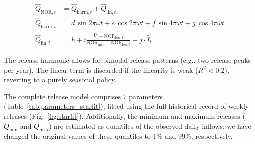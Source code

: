 \documentclass[hess, manuscript]{copernicus}
\begin{document}
{\small
\begin{equation}
\label{eq:starfit_release_linear}
    \begin{aligned}
        \hat{Q}_{\text{NOR},t} &= \hat{Q}_{\text{harm},t} + \hat{Q}_{\text{lin},t} \\[1ex]
        \hat{Q}_{\text{harm},t} &= d \, \sin 2\pi\omega t + e \, \cos 2\pi\omega t + f \, \sin 4\pi\omega t + g \, \cos 4\pi\omega t \\[1ex]
        \hat{Q}_{\text{lin},t} &= h + i \frac{\hat{V}_{t} - \text{NOR}_{\text{low},t}}{\text{NOR}_{\text{up},t} - \text{NOR}_{\text{low},t}} + j \cdot \hat{I}_{t}
    \end{aligned}
\end{equation}
}

The release harmonic allows for bimodal release patterns (e.g., two release peaks per year). The linear term is discarded if the linearity is weak ($R^2 < 0.2$), reverting to a purely seasonal policy.

The complete release model comprises 7 parameters (Table~\ref{tab:parameters_starfit}), fitted using the full historical record of weekly releases (Fig.~\ref{fig:starfit}). Additionally, the minimum and maximum releases ($Q_{\min}$ and $Q_{\max}$) are estimated as quantiles of the observed daily inflows; we have changed the original values of these quantiles to 1\% and 99\%, respectively.
\end{document}
